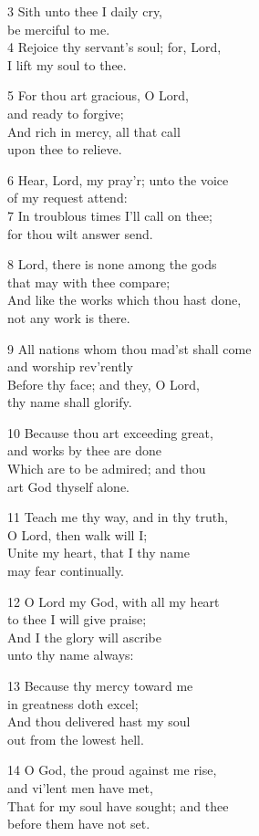 3 Sith unto thee I daily cry,\\
be merciful to me.\\
4 Rejoice thy servant’s soul; for, Lord,\\
I lift my soul to thee.

5 For thou art gracious, O Lord,\\
and ready to forgive;\\
And rich in mercy, all that call\\
upon thee to relieve.

6 Hear, Lord, my pray’r; unto the voice\\
of my request attend:\\
7 In troublous times I’ll call on thee;\\
for thou wilt answer send.

8 Lord, there is none among the gods\\
that may with thee compare;\\
And like the works which thou hast done,\\
not any work is there.

9 All nations whom thou mad’st shall come\\
and worship rev’rently\\
Before thy face; and they, O Lord,\\
thy name shall glorify.

10 Because thou art exceeding great,\\
and works by thee are done\\
Which are to be admired; and thou\\
art God thyself alone.

11 Teach me thy way, and in thy truth,\\
O Lord, then walk will I;\\
Unite my heart, that I thy name\\
may fear continually.

12 O Lord my God, with all my heart\\
to thee I will give praise;\\
And I the glory will ascribe\\
unto thy name always:

13 Because thy mercy toward me\\
in greatness doth excel;\\
And thou delivered hast my soul\\
out from the lowest hell.

14 O God, the proud against me rise,\\
and vi’lent men have met,\\
That for my soul have sought; and thee\\
before them have not set.

